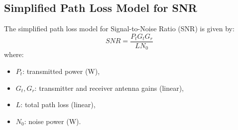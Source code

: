 \documentclass[a4paper,12pt]{book}
\begin{document}
	\subsection{Simplified Path Loss Model for SNR}
	The simplified path loss model for Signal-to-Noise Ratio (SNR) is given by:
	\[
	SNR = \frac{P_t G_t G_r}{L N_0}
	\]
	where:
	\begin{itemize}
		\item \( P_t \): transmitted power (W),
		\item \( G_t, G_r \): transmitter and receiver antenna gains (linear),
		\item \( L \): total path loss (linear),
		\item \( N_0 \): noise power (W).
	\end{itemize}    
	
	
\end{document}
